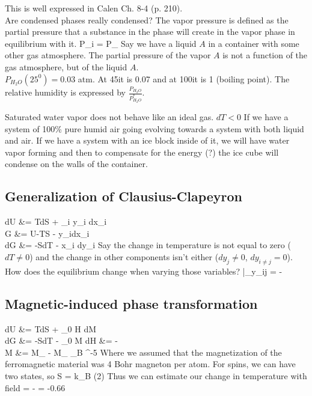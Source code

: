 \documentclass[12pt]{article}
\begin{document}
This is well expressed in Calen Ch. 8-4 (p. 210).\\

Are condensed phases really condensed?
The vapor pressure is defined as the partial pressure that a substance in the  phase will create in the vapor phase in equilibrium with it.
\eqs
P_i =  P_
\eqe
Say we have a liquid $A$ in a container with some other gas atmosphere.  The partial pressure of the vapor $A$ is not a function of the gas atmosphere, but of the liquid $A$.\\

 $P_{H_2O}(25^0) = 0.03$ atm.  At 45\degree it is 0.07 and at 100\degree it is 1 (boiling point).  The relative humidity is expressed by $\frac{P_{H_2O}}{P_{H_2O}^*}$.

Saturated water vapor does not behave like an ideal gas.  $dT<0$ If we have a system of 100\% pure humid air going evolving towards a system with both liquid and air.  If we have a system with an ice block inside of it, we will have water vapor forming and then to compensate for the energy (?) the ice cube will condense on the walls of the container.

\subsection{Generalization of Clausius-Clapeyron}
\eqs
dU &= TdS + \sum_i y_i dx_i\\
G &= U-TS - y_idx_i\\
dG &= -SdT - \sum x_i dy_i
\eqe
Say the change in temperature is not equal to zero ($dT \neq 0$) and the change in other components isn't either ($dy_j \neq 0$, $dy_{i\neq j} = 0$).  How does the equilibrium change when varying those variables?
\eqs
{}|_{y_{i\neq j}} = - 
\eqe  

\subsection{Magnetic-induced phase transformation}
\eqs
dU &= TdS + \mu_0 H dM\\
dG &= -SdT - \mu_0 M dH
\eqe
\eqs
{} &= -\\
\eqe
\eqs
\Delta M &= M_ - M_  \mu_B  ^{-5} 
\eqe
Where we assumed that the magnetization of the ferromagnetic material was 4 Bohr magneton per atom.  For spins, we can have two states, so 
\eqs
\Delta S = k_B \ln(2)
\eqe
Thus we can estimate our change in temperature with field
\eqs
{} = - = -0.66 
\eqe
\end{document}
